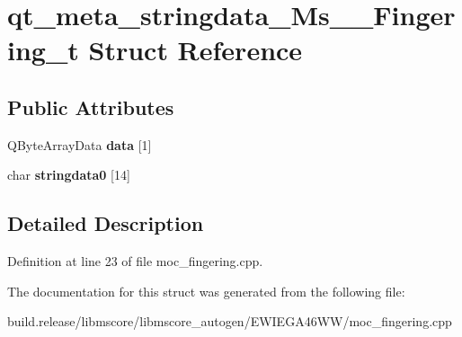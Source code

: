 \hypertarget{structqt__meta__stringdata___ms_____fingering__t}{}\section{qt\+\_\+meta\+\_\+stringdata\+\_\+\+Ms\+\_\+\+\_\+\+Fingering\+\_\+t Struct Reference}
\label{structqt__meta__stringdata___ms_____fingering__t}
\subsection*{Public Attributes}
\begin{DoxyCompactItemize}
\item 
\mbox{\label{structqt__meta__stringdata___ms_____fingering__t_aeb03ba32d11078a99ca340e334aba09b}} 
Q\+Byte\+Array\+Data {\bfseries data} \mbox{[}1\mbox{]}
\item 
\mbox{\label{structqt__meta__stringdata___ms_____fingering__t_a31c7425d8e47b5cb3a79bc1044ef1d03}} 
char {\bfseries stringdata0} \mbox{[}14\mbox{]}
\end{DoxyCompactItemize}


\subsection{Detailed Description}


Definition at line 23 of file moc\+\_\+fingering.\+cpp.



The documentation for this struct was generated from the following file\+:\begin{DoxyCompactItemize}
\item 
build.\+release/libmscore/libmscore\+\_\+autogen/\+E\+W\+I\+E\+G\+A46\+W\+W/moc\+\_\+fingering.\+cpp\end{DoxyCompactItemize}
